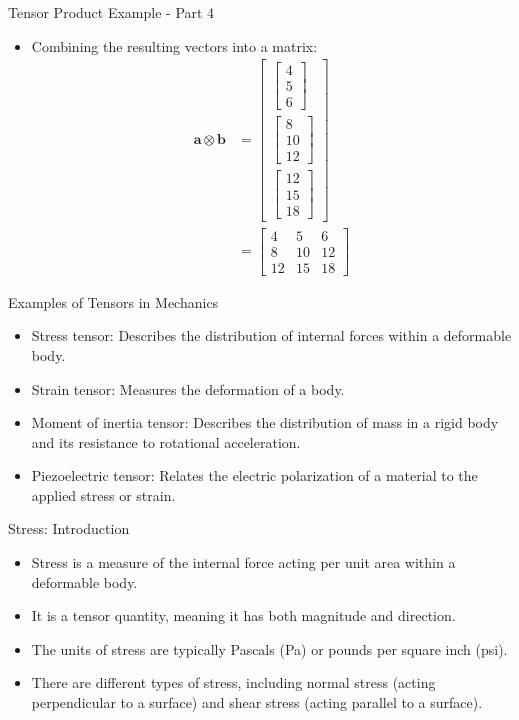 \documentclass{beamer}
\begin{document}
\begin{frame}{Tensor Product Example - Part 4}
\begin{itemize}
\item Combining the resulting vectors into a matrix:
\begin{align*}
\mathbf{a} \otimes \mathbf{b} &= \begin{bmatrix} \begin{bmatrix} 4 \\ 5 \\ 6 \end{bmatrix} \\ \begin{bmatrix} 8 \\ 10 \\ 12 \end{bmatrix} \\ \begin{bmatrix} 12 \\ 15 \\ 18 \end{bmatrix} \end{bmatrix} \\
&= \begin{bmatrix} 4 & 5 & 6 \\ 8 & 10 & 12 \\ 12 & 15 & 18 \end{bmatrix}
\end{align*}
\end{itemize}
\end{frame}

\begin{frame}{Examples of Tensors in Mechanics}
    \begin{itemize}
        \item Stress tensor: Describes the distribution of internal forces within a deformable body.
        \item Strain tensor: Measures the deformation of a body.
        \item Moment of inertia tensor: Describes the distribution of mass in a rigid body and its resistance to rotational acceleration.
        \item Piezoelectric tensor: Relates the electric polarization of a material to the applied stress or strain.
    \end{itemize}
\end{frame}

\begin{frame}{Stress: Introduction}
    \begin{itemize}
        \item Stress is a measure of the internal force acting per unit area within a deformable body.
        \item It is a tensor quantity, meaning it has both magnitude and direction.
        \item The units of stress are typically Pascals (Pa) or pounds per square inch (psi).
        \item There are different types of stress, including normal stress (acting perpendicular to a surface) and shear stress (acting parallel to a surface).
    \end{itemize}
\end{frame}
\end{document}
